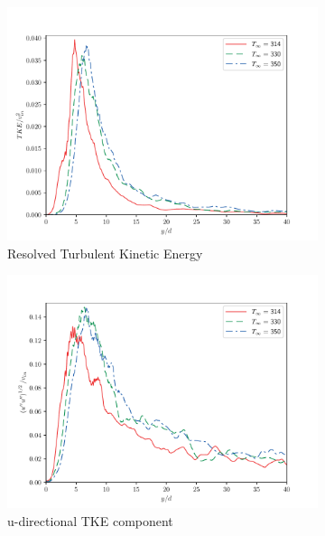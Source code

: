 \begin{figure}[H]
\begin{center}
\begin{subfigure}{0.45\textwidth}
	\includegraphics[scale=.45]{figures/Plots/centerline/TKE_centerline.pdf}
	\caption{Resolved Turbulent Kinetic Energy} \label{TKE_centerline_1}
\end{subfigure}
\begin{subfigure}{0.45\textwidth}
	\includegraphics[scale=.45]{figures/Plots/centerline/u_fa_centerline.pdf}
	\caption{u-directional TKE component} \label{u_fa_1}
\end{subfigure}
\vfill
\begin{subfigure}{0.45\textwidth}

\end{subfigure}
\end{center}
\end{figure}
